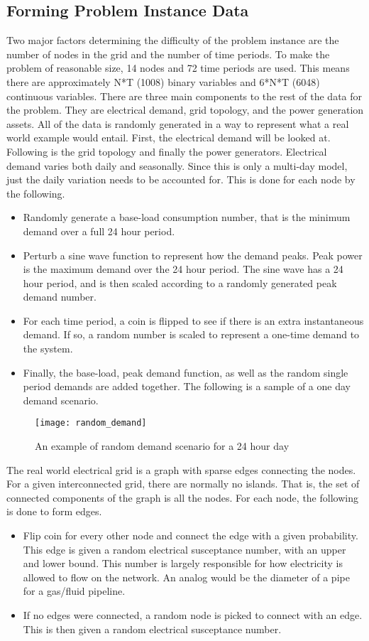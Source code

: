 \subsection{Forming Problem Instance Data}
Two major factors determining the difficulty of the problem instance are the number of nodes in
the grid and the number of time periods. To make the problem of reasonable size, 14 nodes and 72
time periods are used. This means there are approximately N*T (1008) binary variables and 6*N*T
(6048) continuous variables. There are three main components to the rest of the data for the problem.
They are electrical demand, grid topology, and the power generation assets. All of the data is randomly
generated in a way to represent what a real world example would entail. First, the electrical demand
will be looked at. Following is the grid topology and finally the power generators.
Electrical demand varies both daily and seasonally. Since this is only a multi-day model, just the
daily variation needs to be accounted for. This is done for each node by the following.

\begin{itemize}
\item Randomly generate a base-load consumption number, that is the minimum demand
over a full 24 hour period.
\item Perturb a sine wave function to represent how the demand peaks. Peak power is the
maximum demand over the 24 hour period. The sine wave has a 24 hour period, and is
then scaled according to a randomly generated peak demand number.
\item For each time period, a coin is flipped to see if there is an extra instantaneous demand.
If so, a random number is scaled to represent a one-time demand to the system.
\item Finally, the base-load, peak demand function, as well as the random single period
demands are added together. The following is a sample of a one day demand scenario.
\end{itemize}

\begin{figure}[h]
\centering
\texttt{[image: random\_demand]}
\caption{An example of random demand scenario for a 24 hour day}
\label{fig:random_demand}
\end{figure}

The real world electrical grid is a graph with sparse edges connecting the nodes. For a given
interconnected grid, there are normally no islands. That is, the set of connected components of the
graph is all the nodes. For each node, the following is done to form edges.
\begin{itemize}
\item Flip coin for every other node and connect the edge with a given probability. This edge
is given a random electrical susceptance number, with an upper and lower bound. This
number is largely responsible for how electricity is allowed to flow on the network. An
analog would be the diameter of a pipe for a gas/fluid pipeline.
\item If no edges were connected, a random node is picked to connect
with an edge. This is then given a random electrical susceptance
number.
\end{itemize}

